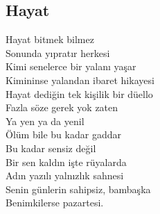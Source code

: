 \subsection{Hayat}

Hayat bitmek bilmez \\
Sonunda yıpratır herkesi \\
Kimi senelerce bir yalanı yaşar \\
Kimininse yalandan ibaret hikayesi \\

\noindent\newline
Hayat dediğin tek kişilik bir düello \\
Fazla söze gerek yok zaten \\
Ya yen ya da yenil \\
Ölüm bile bu kadar gaddar \\
Bu kadar sensiz değil \\

\noindent\newline
Bir sen kaldın işte rüyalarda \\
Adın yazılı yalnızlık sahnesi \\
Senin günlerin sahipsiz, bambaşka \\
Benimkilerse pazartesi. \\